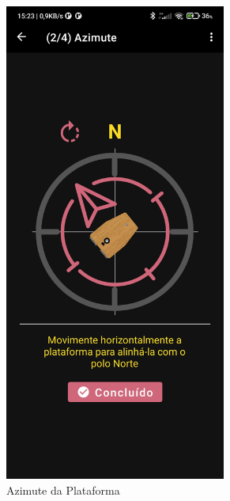 \begin{figure}[!htb]
\begin{subfigure}[b]{0.3\textwidth}
		\includegraphics[width=0.8\textwidth]{figuras/desAplicativo/azimute}
		\caption{Azimute da Plataforma}
		\label{menu1st}
	\end{subfigure}
	\hfill
	\begin{subfigure}[b]{0.3\textwidth}
		\centering

\end{subfigure}
\end{figure}
